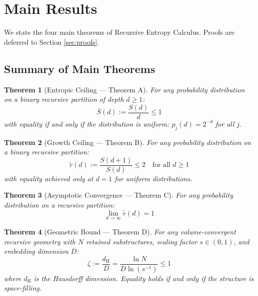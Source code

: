 \documentclass[11pt,a4paper]{article}
\newtheorem{theorem}{Theorem}[section]
\theoremstyle{definition}
\theoremstyle{remark}
\newcommand{\dH}{d_{\mathrm{H}}}
\newcommand{\Sbar}{\bar{S}}
\newcommand{\rtilde}{\tilde{r}}
\begin{document}
\section{Main Results}
\label{sec:main_results}

We state the four main theorems of Recursive Entropy Calculus. Proofs are deferred to Section \ref{sec:proofs}.

\subsection{Summary of Main Theorems}

\begin{theorem}[Entropic Ceiling --- Theorem A]
\label{thm:A}
For any probability distribution on a binary recursive partition of depth $d \geq 1$:
\begin{equation}
    \Sbar(d) := \frac{S(d)}{d} \leq 1
\end{equation}
with equality if and only if the distribution is uniform: $p_j(d) = 2^{-d}$ for all $j$.
\end{theorem}

\begin{theorem}[Growth Ceiling --- Theorem B]
\label{thm:B}
For any probability distribution on a binary recursive partition:
\begin{equation}
    \rtilde(d) := \frac{S(d+1)}{S(d)} \leq 2 \quad \text{for all } d \geq 1
\end{equation}
with equality achieved only at $d = 1$ for uniform distributions.
\end{theorem}

\begin{theorem}[Asymptotic Convergence --- Theorem C]
\label{thm:C}
For any probability distribution on a recursive partition:
\begin{equation}
    \lim_{d \to \infty} \rtilde(d) = 1
\end{equation}
\end{theorem}

\begin{theorem}[Geometric Bound --- Theorem D]
\label{thm:D}
For any volume-convergent recursive geometry with $N$ retained substructures, scaling factor $s \in (0,1)$, and embedding dimension $D$:
\begin{equation}
    \zeta := \frac{\dH}{D} = \frac{\ln N}{D \ln(s^{-1})} \leq 1
\end{equation}
where $\dH$ is the Hausdorff dimension. Equality holds if and only if the structure is space-filling.
\end{theorem}
\end{document}
